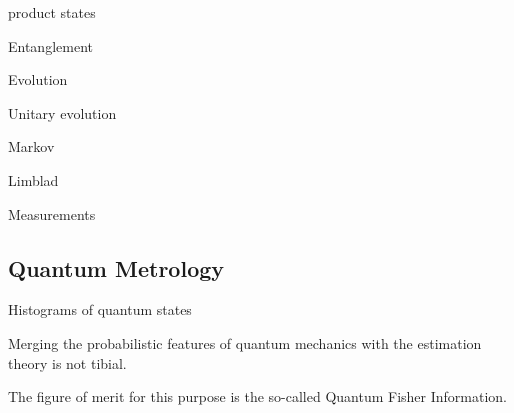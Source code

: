 product states

Entanglement

Evolution

Unitary evolution

Markov

Limblad

Measurements

\subsection{Quantum Metrology}

Histograms of quantum states

Merging the probabilistic features of quantum mechanics with the estimation theory is not tibial.

The figure of merit for this purpose is the so-called Quantum Fisher Information.
